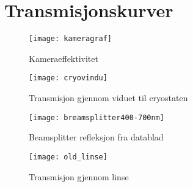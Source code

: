 \appendix
\section{Transmisjonskurver}

\begin{figure}[H]%
\centering
\texttt{[image: kameragraf]}%
\caption{Kameraeffektivitet}%
\label{fig:kameragraf}%
\end{figure}

\begin{figure}[H]%
\centering
\texttt{[image: cryovindu]}%
\caption{Transmisjon gjennom viduet til cryostaten}%
\label{fig:cryovindu}%
\end{figure}


\begin{figure}[H]%
\centering
\texttt{[image: breamsplitter400-700nm]}%
\caption{Beamsplitter refleksjon fra datablad}%
\label{fig:beamsplitter400-700nm}%
\end{figure}

\begin{figure}[H]%
\centering
\texttt{[image: old\_linse]}%
\caption{Transmisjon gjennom linse}%
\label{fig:linsetrans}%
\end{figure}